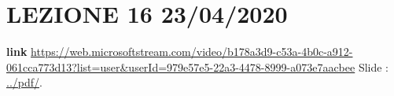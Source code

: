 \section*{LEZIONE 16 23/04/2020}
\textbf{link} \url{https://web.microsoftstream.com/video/b178a3d9-c53a-4b0c-a912-061cca773d13?list=user&userId=979e57e5-22a3-4478-8999-a073e7aacbee}\newline
\newline
Slide : \url{../pdf/}.